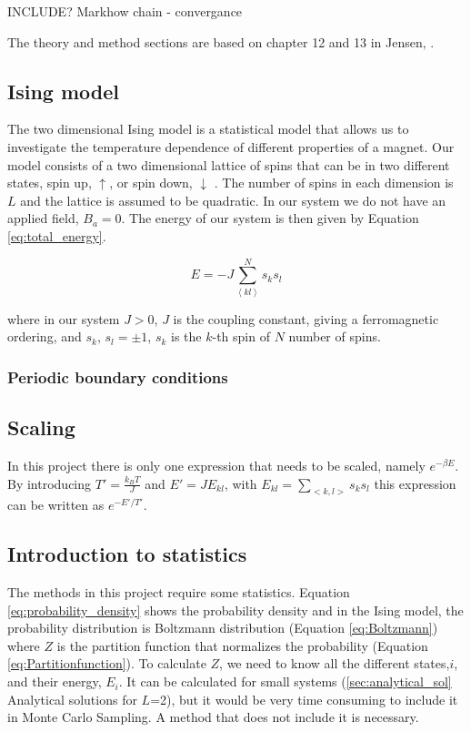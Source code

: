 INCLUDE?
Markhow chain - convergance


The theory and method sections are based on chapter 12 and 13 in Jensen, \cite{Jensen}.

\subsection{Ising model}

The two dimensional Ising model is a statistical model that allows us to investigate the temperature dependence of different properties of a magnet. Our model consists of a two dimensional lattice of spins that can be in two different states, spin up, $\uparrow$, or spin down, $\downarrow$ \cite{Ising}. The number of spins in each dimension is $L$ and the lattice is assumed to be quadratic. In our system we do not have an applied field, $B_a = 0$. The energy of our system is then given by Equation \ref{eq:total_energy}.

\begin{equation}\label{eq:total_energy}
E = - J \sum^N_{\left< kl \right>} s_k s_l
\end{equation}

where in our system $J > 0$, $J$ is the coupling constant, giving a ferromagnetic ordering, and $s_k, \, s_l = \pm 1$, $s_k$ is the $k$-th spin of $N$ number of spins.

\subsubsection{Periodic boundary conditions}

\subsection{Scaling}

In this project there is only one expression that needs to be scaled, namely $ e^{-\beta E} $. By introducing $ T' = \frac{k_B T	}{J} $ and $ E' = JE_{kl} $, with $ E_{kl} = \sum\limits_{<k,l>} s_ks_l $ this expression can be written as $ e^{-E'/T'} $.


\subsection{Introduction to statistics}

The methods in this project require some statistics. Equation \ref{eq:probability_density} shows the probability density and in the Ising model, the probability distribution is Boltzmann distribution (Equation \ref{eq:Boltzmann}) where $Z$ is the partition function that normalizes the probability (Equation \ref{eq:Partitionfunction}). To calculate $Z$, we need to know all the different states,$i$, and their energy, $E_i$. It can be calculated for small systems (\ref{sec:analytical_sol} Analytical solutions for $L$=2), but it would be very time consuming to include it in Monte Carlo Sampling. A method that does not include it is necessary.

